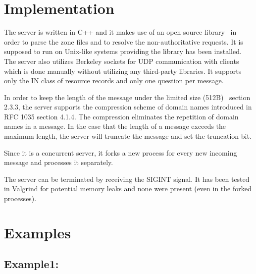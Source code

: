 \documentclass[12pt,a4paper,titlepage,final]{article}
\begin{document}
\section{Implementation} \label{sec:implementation}
The server is written in C++ and it makes use of an open source
library~\cite{ldns} in order to parse the zone files and to resolve the
non-authoritative requests. It is supposed to run on Unix-like systems providing
the library has been installed. The server also utilizes Berkeley sockets for
UDP communication with clients which is done manually without utilizing any
third-party libraries. It supports only the IN class of resource records and
only one question per message.

In order to keep the length of the message under the limited size
(512B)~\cite{rfc1035} section 2.3.3, the server supports the compression scheme
of domain names introduced in RFC 1035 \cite{rfc1035} section 4.1.4. The
compression eliminates the repetition of domain names in a message. In the case
that the length of a message exceeds the maximum length, the server will
truncate the message and set the truncation bit.

Since it is a concurrent server, it forks a new process for every new incoming
message and processes it separately.

The server can be terminated by receiving the SIGINT signal. It has been tested
in Valgrind for potential memory leaks and none were present (even in the forked
processes).

\section{Examples} \label{sec:examples}

\subsection{Example1:} \label{subsec:ex1}
\end{document}
